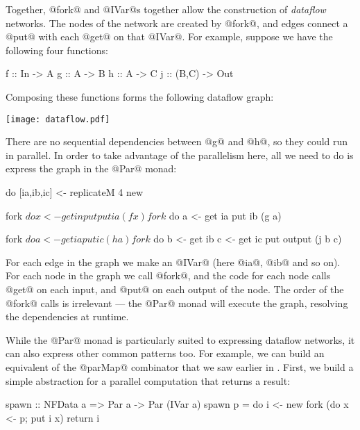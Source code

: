 Together, @fork@ and @IVar@s together allow the construction of
\emph{dataflow} networks.  The nodes of the network are created by
@fork@, and edges connect a @put@ with each @get@ on that @IVar@.  For
example, suppose we have the following four functions:

\begin{haskell}
f :: In -> A
g :: A -> B
h :: A -> C
j :: (B,C) -> Out
\end{haskell}

\noindent Composing these functions forms the following dataflow graph:

\begin{center}
\texttt{[image: dataflow.pdf]}
\end{center}

There are no sequential dependencies between @g@ and @h@, so they
could run in parallel.  In order to take advantage of the parallelism
here, all we need to do is express the graph in the @Par@ monad:

\begin{haskell}
do
   [ia,ib,ic] <- replicateM 4 new

   fork $ do x <- get input
             put ia (f x)

   fork $ do a <- get ia
             put ib (g a)

   fork $ do a <- get ia
             put ic (h a)

   fork $ do b <- get ib
             c <- get ic
             put output (j b c)
\end{haskell}

\noindent For each edge in the graph we make an @IVar@ (here @ia@,
@ib@ and so on).  For each node in the graph we call @fork@, and the
code for each node calls @get@ on each input, and @put@ on each output
of the node.  The order of the @fork@ calls is irrelevant --- the
@Par@ monad will execute the graph, resolving the dependencies at
runtime.

While the @Par@ monad is particularly suited to expressing dataflow
networks, it can also express other common patterns too.  For example,
we can build an equivalent of the @parMap@ combinator that we saw
earlier in .  First, we build a simple abstraction
for a parallel computation that returns a result:

\begin{haskell}
spawn :: NFData a => Par a -> Par (IVar a)
spawn p = do
  i <- new
  fork (do x <- p; put i x)
  return i
\end{haskell}

